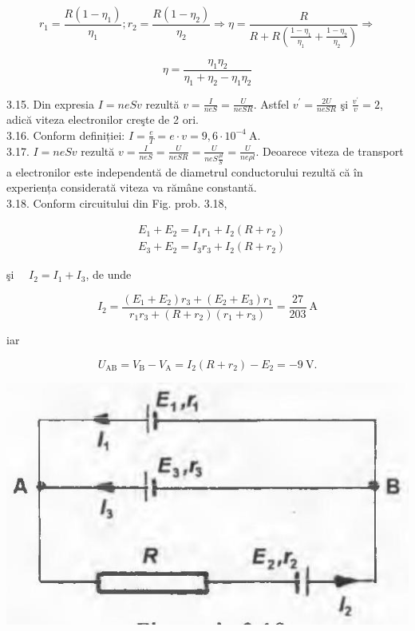 \documentclass[10pt]{article}
\begin{document}
$$
r_{1}=\frac{R\left(1-\eta_{1}\right)}{\eta_{1}} ; r_{2}=\frac{R\left(1-\eta_{2}\right)}{\eta_{2}} \Rightarrow \eta=\frac{R}{R+R\left(\frac{1-\eta_{1}}{\eta_{1}}+\frac{1-\eta_{2}}{\eta_{2}}\right)} \Rightarrow
$$

$$
\eta=\frac{\eta_{1} \eta_{2}}{\eta_{1}+\eta_{2}-\eta_{1} \eta_{2}}
$$

3.15. Din expresia $I=n e S v$ rezultă $v=\frac{I}{n e S}=\frac{U}{n e S R}$. Astfel $v^{\prime}=\frac{2 U}{n e S R}$ şi $\frac{v^{\prime}}{v}=2$, adică viteza electronilor creşte de 2 ori.\\
3.16. Conform definiției: $I=\frac{e}{T}=e \cdot v=9,6 \cdot 10^{-4} \mathrm{~A}$.\\
3.17. $I=n e S v$ rezultă $v=\frac{I}{n e S}=\frac{U}{n e S R}=\frac{U}{n e S \frac{\rho l}{S}}=\frac{U}{n e \rho l}$. Deoarece viteza de transport a electronilor este independentă de diametrul conductorului rezultă că în experiența considerată viteza va rămâne constantă.\\
3.18. Conform circuitului din Fig. prob. 3.18,

$$
\begin{aligned}
& E_{1}+E_{2}=I_{1} r_{1}+I_{2}\left(R+r_{2}\right) \\
& E_{3}+E_{2}=I_{3} r_{3}+I_{2}\left(R+r_{2}\right)
\end{aligned}
$$

şi $\quad I_{2}=I_{1}+I_{3}$, de unde

$$
I_{2}=\frac{\left(E_{1}+E_{2}\right) r_{3}+\left(E_{2}+E_{3}\right) r_{1}}{r_{1} r_{3}+\left(R+r_{2}\right)\left(r_{1}+r_{3}\right)}=\frac{27}{203} \mathrm{~A}
$$

iar

$$
U_{\mathrm{AB}}=V_{\mathrm{B}}-V_{\mathrm{A}}=I_{2}\left(R+r_{2}\right)-E_{2}=-9 \mathrm{~V} .
$$

\begin{center}
\includegraphics[max width=\textwidth]{2025_07_01_5b3ff9fa0d508c8e9f17g-344}
\end{center}
\end{document}
